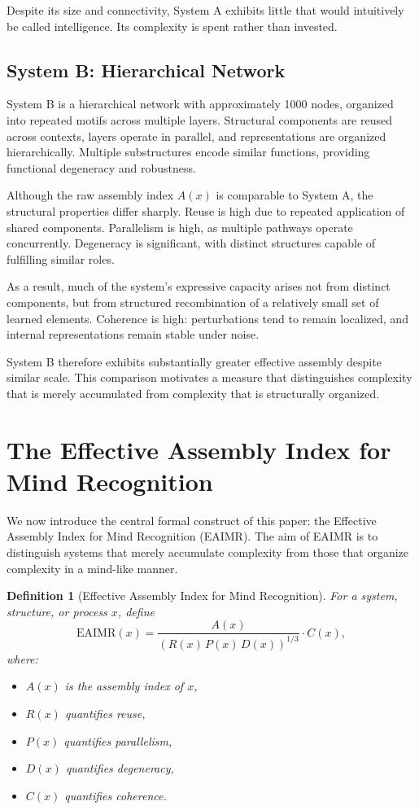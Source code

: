 \documentclass[11pt,letterpaper]{article}
\newtheorem{definition}{Definition}
\begin{document}
Despite its size and connectivity, System A exhibits little that would intuitively be called intelligence. Its complexity is spent rather than invested.

\subsection{System B: Hierarchical Network}

System B is a hierarchical network with approximately 1000 nodes, organized into repeated motifs across multiple layers. Structural components are reused across contexts, layers operate in parallel, and representations are organized hierarchically. Multiple substructures encode similar functions, providing functional degeneracy and robustness.

Although the raw assembly index $A(x)$ is comparable to System A, the structural properties differ sharply. Reuse is high due to repeated application of shared components. Parallelism is high, as multiple pathways operate concurrently. Degeneracy is significant, with distinct structures capable of fulfilling similar roles.

As a result, much of the system’s expressive capacity arises not from distinct components, but from structured recombination of a relatively small set of learned elements. Coherence is high: perturbations tend to remain localized, and internal representations remain stable under noise.

System B therefore exhibits substantially greater effective assembly despite similar scale. This comparison motivates a measure that distinguishes complexity that is merely accumulated from complexity that is structurally organized.

\section{The Effective Assembly Index for Mind Recognition}

We now introduce the central formal construct of this paper: the Effective Assembly Index for Mind Recognition (EAIMR). The aim of EAIMR is to distinguish systems that merely accumulate complexity from those that organize complexity in a mind-like manner.

\begin{definition}[Effective Assembly Index for Mind Recognition]
For a system, structure, or process $x$, define
\[
\mathrm{EAIMR}(x)
=
\frac{A(x)}{\left(R(x)\,P(x)\,D(x)\right)^{1/3}} \cdot C(x),
\]
where:
\begin{itemize}
\item $A(x)$ is the assembly index of $x$,
\item $R(x)$ quantifies reuse,
\item $P(x)$ quantifies parallelism,
\item $D(x)$ quantifies degeneracy,
\item $C(x)$ quantifies coherence.
\end{itemize}
\end{definition}
\end{document}
